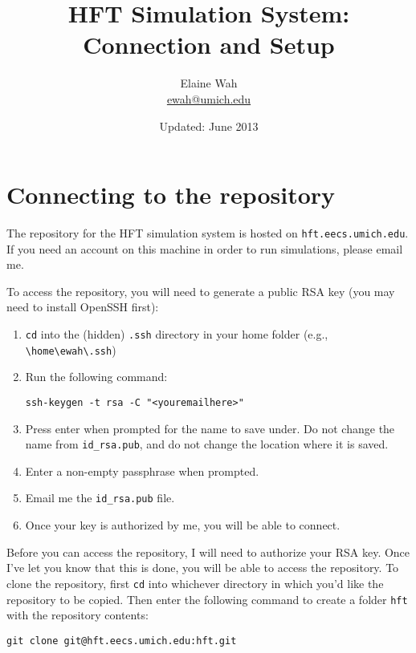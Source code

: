 \documentclass[11pt]{article}
\begin{document}
	
\title{HFT Simulation System: \\
Connection and Setup}
\author{
Elaine Wah\\
\href{mailto:ewah@umich.edu}{ewah@umich.edu}
}
\date{Updated: June 2013}
\maketitle


\section{Connecting to the repository}

The repository for the HFT simulation system is hosted on \verb|hft.eecs.umich.edu|. If you need an account on this machine in order to run simulations, please email me.

To access the repository, you will need to generate a public RSA key (you may need to install OpenSSH first):
\begin{enumerate}
\item \verb|cd| into the (hidden) \verb|.ssh| directory in your home folder (e.g., \verb|\home\ewah\.ssh|)
\item Run the following command:

\verb|ssh-keygen -t rsa -C "<youremailhere>"|
\item Press enter when prompted for the name to save under. Do not change the name from \verb|id_rsa.pub|, and do not change the location where it is saved.
\item Enter a non-empty passphrase when prompted.
\item Email me the \verb|id_rsa.pub| file.
\item Once your key is authorized by me, you will be able to connect.
\end{enumerate}

Before you can access the repository, I will need to authorize your RSA key. Once I've let you know that this is done, you will be able to access the repository.
%
To clone the repository, first \verb|cd| into whichever directory in which you'd like the repository to be copied. Then enter the following command to create a folder \verb|hft| with the repository contents:
\begin{verbatim}
git clone git@hft.eecs.umich.edu:hft.git
\end{verbatim}

\end{document}
